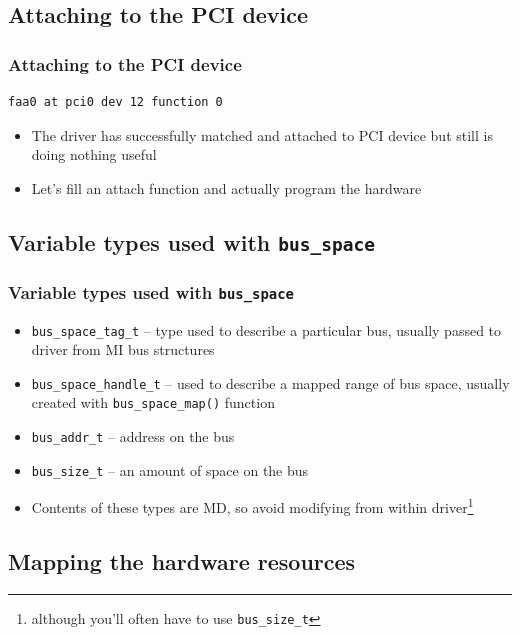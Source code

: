\documentclass[dvipsnames,table]{beamer}
\begin{document}
\subsection{Attaching to the PCI device}

\begin{frame}[fragile]
\frametitle{Attaching to the PCI device}
\begin{verbatim}
faa0 at pci0 dev 12 function 0
\end{verbatim}
\begin{itemize}
	\item The driver has successfully matched and attached to PCI device but still is doing nothing useful
	\item Let's fill an attach function and actually program the hardware
\end{itemize}
\end{frame}

\subsection{Variable types used with {\tt bus\_space}}

\begin{frame}
\frametitle{Variable types used with {\tt bus\_space}}

\begin{itemize}
         \item {\tt bus\_space\_tag\_t} -- type used to describe a particular bus, usually passed to driver from MI bus structures
         \item {\tt bus\_space\_handle\_t} --  used to describe a mapped range of bus space, usually created with {\tt bus\_space\_map()} function
         \item {\tt bus\_addr\_t} -- address on the bus
         \item {\tt bus\_size\_t} -- an amount of space on the bus
         \item Contents of these types are MD, so avoid modifying from within driver\footnote{although you'll often have to use {\tt bus\_size\_t}}
\end{itemize}
\end{frame}


\subsection{Mapping the hardware resources}
\end{document}
